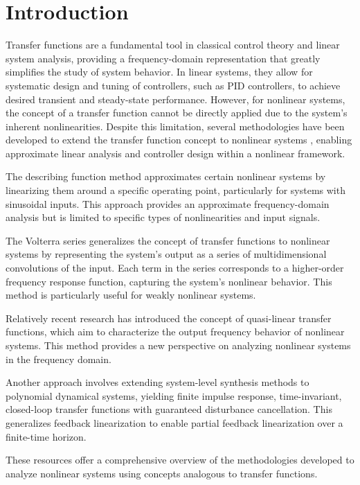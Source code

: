 \documentclass[preprint,12pt]{elsarticle}
\begin{document}
\section{Introduction}
Transfer functions are a fundamental tool in classical control theory and linear system analysis, providing a frequency-domain representation that greatly simplifies the study of system behavior. In linear systems, they allow for systematic design and tuning of controllers, such as PID controllers, to achieve desired transient and steady-state performance. However, for nonlinear systems, the concept of a transfer function cannot be directly applied due to the system's inherent nonlinearities. Despite this limitation, several methodologies have been developed to extend the transfer function concept to nonlinear systems \cite{schetzen1980volterra}, enabling approximate linear analysis and controller design within a nonlinear framework.

The describing function method approximates certain nonlinear systems by linearizing them around a specific operating point, particularly for systems with sinusoidal inputs. This approach provides an approximate frequency-domain analysis but is limited to specific types of nonlinearities and input signals. 

The Volterra series generalizes the concept of transfer functions to nonlinear systems by representing the system's output as a series of multidimensional convolutions of the input. Each term in the series corresponds to a higher-order frequency response function, capturing the system's nonlinear behavior. This method is particularly useful for weakly nonlinear systems. 

Relatively recent research has introduced the concept of quasi-linear transfer functions, which aim to characterize the output frequency behavior of nonlinear systems. This method provides a new perspective on analyzing nonlinear systems in the frequency domain. 

Another approach involves extending system-level synthesis methods to polynomial dynamical systems, yielding finite impulse response, time-invariant, closed-loop transfer functions with guaranteed disturbance cancellation. This generalizes feedback linearization to enable partial feedback linearization over a finite-time horizon. 

These resources offer a comprehensive overview of the methodologies developed to analyze nonlinear systems using concepts analogous to transfer functions. 
\end{document}
